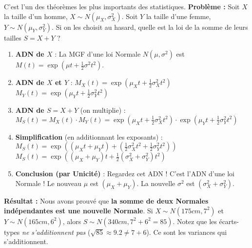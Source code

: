 \begin{examplebox}
C'est l'un des théorèmes les plus importants des statistiques.
\textbf{Problème :} Soit $X$ la taille d'un homme, $X \sim N(\mu_X, \sigma_X^2)$. Soit $Y$ la taille d'une femme, $Y \sim N(\mu_Y, \sigma_Y^2)$. Si on les choisit au hasard, quelle est la loi de la somme de leurs tailles $S = X+Y$ ?

\begin{enumerate}
    \item \textbf{ADN de $X$} : La MGF d'une loi Normale $N(\mu, \sigma^2)$ est $M(t) = \exp(\mu t + \frac{1}{2}\sigma^2 t^2)$.
    \item \textbf{ADN de $X$ et $Y$} :
    $M_X(t) = \exp(\mu_X t + \frac{1}{2}\sigma_X^2 t^2)$
    $M_Y(t) = \exp(\mu_Y t + \frac{1}{2}\sigma_Y^2 t^2)$
    
    \item \textbf{ADN de $S = X+Y$} (on multiplie) :
    $M_S(t) = M_X(t) \cdot M_Y(t) = \exp(\mu_X t + \frac{1}{2}\sigma_X^2 t^2) \cdot \exp(\mu_Y t + \frac{1}{2}\sigma_Y^2 t^2)$
    
    \item \textbf{Simplification} (en additionnant les exposants) :
    $M_S(t) = \exp\left( (\mu_X t + \mu_Y t) + (\frac{1}{2}\sigma_X^2 t^2 + \frac{1}{2}\sigma_Y^2 t^2) \right)$
    $M_S(t) = \exp\left( (\mu_X + \mu_Y)t + \frac{1}{2}(\sigma_X^2 + \sigma_Y^2)t^2 \right)$
    
    \item \textbf{Conclusion (par Unicité)} :
    Regardez cet ADN ! C'est l'ADN d'une loi Normale !
    Le nouveau $\mu$ est $(\mu_X + \mu_Y)$.
    La nouvelle $\sigma^2$ est $(\sigma_X^2 + \sigma_Y^2)$.
\end{enumerate}

\textbf{Résultat :} Nous avons prouvé que \textbf{la somme de deux Normales indépendantes est une nouvelle Normale}.
Si $X \sim N(175cm, 7^2)$ et $Y \sim N(165cm, 6^2)$, alors $S \sim N(340cm, 7^2 + 6^2 = 85)$.
Notez que les écarts-types \textit{ne s'additionnent pas} ($\sqrt{85} \approx 9.2 \ne 7+6$). Ce sont les variances qui s'additionnent.
\end{examplebox}